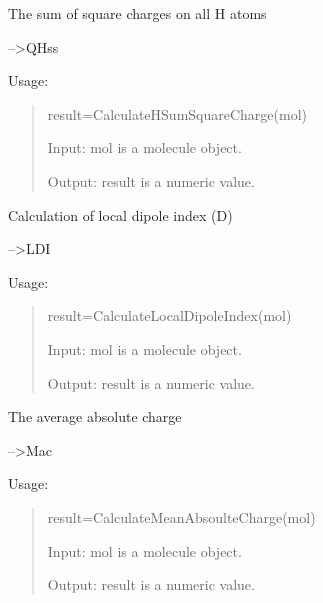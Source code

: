 \documentclass[letterpaper,10pt,english]{sphinxmanual}
\begin{document}

\begin{fulllineitems}
\label{reference/charge:charge.CalculateHSumSquareCharge}
The sum of square charges on all H atoms

--\textgreater{}QHss

Usage:
\begin{quote}

result=CalculateHSumSquareCharge(mol)

Input: mol is a molecule object.

Output: result is a numeric value.
\end{quote}

\end{fulllineitems}


\begin{fulllineitems}
\label{reference/charge:charge.CalculateLocalDipoleIndex}
Calculation of local dipole index (D)

--\textgreater{}LDI

Usage:
\begin{quote}

result=CalculateLocalDipoleIndex(mol)

Input: mol is a molecule object.

Output: result is a numeric value.
\end{quote}

\end{fulllineitems}


\begin{fulllineitems}
\label{reference/charge:charge.CalculateMeanAbsoulteCharge}
The average absolute charge

--\textgreater{}Mac

Usage:
\begin{quote}

result=CalculateMeanAbsoulteCharge(mol)

Input: mol is a molecule object.

Output: result is a numeric value.
\end{quote}

\end{fulllineitems}
\end{document}
